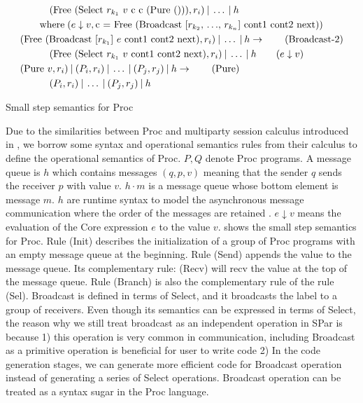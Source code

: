 \begin{table}[ht]
\begin{align*}
    &\qquad \quad (\text{Free (Select $r_{k_1}$ $v$ c c (Pure ()))}, r_i) \: | \: \ldots \: | \: h \notag\\ 
    & \qquad \text{where} \;(e \downarrow v, \text{c = Free (Broadcast [$r_{k_2}$, $\ldots$, $r_{k_n}$] cont1 cont2 next)}) \notag\\ 
    &(\text{Free (Broadcast [$r_{k_1}$] $e$ cont1 cont2 next)}, r_i) \: | \: \ldots \: | \: h \rightarrow  \tag{Broadcast-2}\\ 
    &\qquad \quad (\text{Free (Select $r_{k_1}$ $v$ cont1 cont2 next)}, r_i) \: | \: \ldots \: | \: h \qquad (e \downarrow v) \notag\\ 
    &(\text{Pure $v$}, r_i) \: | \: (P_i, r_i) \: | \: \ldots \: | \: (P_j, r_j) \: | \: h \rightarrow \tag{Pure}\\
    & \qquad \quad (P_i, r_i) \: | \: \ldots \: | \: (P_j, r_j) \: | \: h \notag\\ 
\end{align*}
\caption{Small step semantics for Proc}
\label{spar:sstep}
\end{table}
Due to the similarities between Proc and multiparty session calculus introduced in \cite{coppoGentleIntroductionMultiparty2015}, we borrow some syntax and operational semantics rules from their calculus to define the operational semantics of Proc. $P, Q$ denote Proc programs. A message queue is $h$ which contains messages $(q, p, v)$ meaning that the sender $q$ sends the receiver $p$ with value $v$. $h \cdot m$ is a message queue whose bottom element is message $m$. $h$ are runtime syntax to model the asynchronous message communication where the order of the messages are retained \cite{coppoGentleIntroductionMultiparty2015}. $e \downarrow v$ means the evaluation of the Core expression $e$ to the value $v$.  shows the small step semantics for Proc. Rule (Init) describes the initialization of a group of Proc programs with an empty message queue at the beginning. Rule (Send) appends the value to the message queue. Its complementary rule: (Recv) will recv the value at the top of the message queue. Rule (Branch) is also the complementary rule of the rule (Sel). Broadcast is defined in terms of Select, and it broadcasts the label to a group of receivers. Even though its semantics can be expressed in terms of Select, the reason why we still treat broadcast as an independent operation in SPar is because 1) this operation is very common in communication, including Broadcast as a primitive operation is beneficial for user to write code 2) In the code generation stages, we can generate more efficient code for Broadcast operation instead of generating a series of Select operations. Broadcast operation can be treated as a syntax sugar in the Proc language. %

